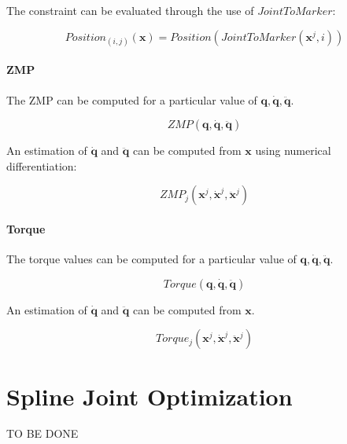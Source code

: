 \documentclass{article}
\begin{document}
The constraint can be evaluated through the use of $JointToMarker$:

\begin{equation}
  Position_{(i,j)}(\mathbf{x}) = Position(JointToMarker(\mathbf{x}^j, i))
\end{equation}

\paragraph{ZMP}

The ZMP can be computed for a particular value of $\mathbf{q}, \mathbf{\dot{q}}, \mathbf{\ddot{q}}$.

\begin{equation}
  ZMP(\mathbf{q}, \mathbf{\dot{q}}, \mathbf{\ddot{q}})
\end{equation}

An estimation of $\mathbf{\dot{q}}$ and $\mathbf{\ddot{q}}$ can be
computed from $\mathbf{x}$ using numerical differentiation:

\begin{equation}
  ZMP_j(\mathbf{x}^j, \mathbf{\dot{x}}^j, \mathbf{\ddot{x}}^j)
\end{equation}


\paragraph{Torque}

The torque values can be computed for a particular value of
$\mathbf{q}, \mathbf{\dot{q}}, \mathbf{\ddot{q}}$.

\begin{equation}
  Torque(\mathbf{q}, \mathbf{\dot{q}}, \mathbf{\ddot{q}})
\end{equation}

An estimation of $\mathbf{\dot{q}}$ and $\mathbf{\ddot{q}}$ can be
computed from $\mathbf{x}$.


\begin{equation}
  Torque_j(\mathbf{x}^j, \mathbf{\dot{x}}^j, \mathbf{\ddot{x}}^j)
\end{equation}


\section{Spline Joint Optimization}

TO BE DONE
\end{document}
